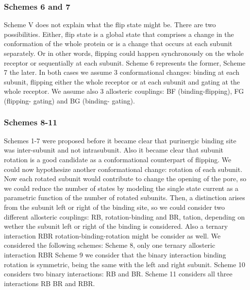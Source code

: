 \documentclass[pdflatex,sn-mathphys-num]{sn-jnl}%
\theoremstyle{thmstyleone}%
\theoremstyle{thmstyletwo}%
\theoremstyle{thmstylethree}%
\begin{document}
\subsubsection{Schemes 6 and 7} \label{scheme67}
Scheme V does not explain what the flip state might be. There are two possibilities. Either, flip state is a global state that comprises a change in the conformation of the whole protein or is a change that occurs at each subunit separately. Or in other words, flipping could happen synchronously on the whole receptor or sequentially at each subunit. 
Scheme 6 represents the former, Scheme 7 the later. In both cases we assume 3 conformational changes: binding at each subunit, flipping either the whole receptor or at each subunit  and gating at the whole receptor. We assume also 3 allosteric couplings: BF (binding-flipping), FG (flipping- gating) and BG (binding- gating). 

\subsubsection{Schemes 8-11} \label{scheme67}
Schemes 1-7 were proposed before it became clear that purinergic binding site was inter-subunit and not intrasubunit. Also it became clear that subunit rotation is a good candidate as a conformational counterpart of flipping. We could now hypothesize another conformational change: rotation of each subunit. Now each rotated subunit would contribute to change the opening of the pore, so we could reduce the number of states by modeling the single state current as a parametric function of the number of rotated subunits. 
Then, a distinction arises from the subunit left or right of the binding site, so we could consider two different allosteric couplings: RB, rotation-binding and BR, tation, depending on wether the subunit left or right of the binding is considered. Also a ternary interaction RBR  rotation-binding-rotation might be consider as well. We considered the following schemes:
Scheme 8, only one ternary allosteric interaction RBR
Scheme 9 we consider that the binary interaction binding rotation is symmetric, being the same with the left and right subunit. 
Scheme 10 considers two binary interactions: RB and BR.
Scheme 11 considers all three interactions RB BR and RBR. 
\end{document}

